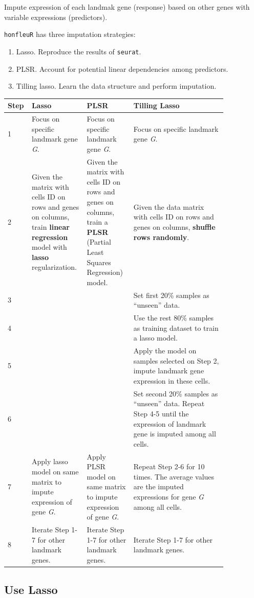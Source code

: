 \documentclass[]{article}
\providecommand{\tightlist}{%
  \setlength{\itemsep}{0pt}\setlength{\parskip}{0pt}}
\begin{document}
Impute expression of each landmak gene (response) based on other genes
with variable expressions (predictors).

\texttt{honfleuR} has three imputation strategies:

\begin{enumerate}
\def\labelenumi{\arabic{enumi}.}
\tightlist
\item
  Lasso. Reproduce the results of \texttt{seurat}.
\item
  PLSR. Account for potential linear dependencies among predictors.
\item
  Tilling lasso. Learn the data structure and perform imputation.
\end{enumerate}

\begin{longtable}[l]{p{0.05\linewidth} *{2}{p{0.2\linewidth}} p{0.4\linewidth} }
\toprule
Step & Lasso & PLSR & Tilling Lasso\tabularnewline
\midrule
\endhead
1 & Focus on specific landmark gene \emph{G}. & Focus on specific
landmark gene \emph{G}. & Focus on specific landmark gene
\emph{G}.\tabularnewline
2 & Given the matrix with cells ID on rows and genes on columns, train
\textbf{linear regression} model with \textbf{lasso} regularization. &
Given the matrix with cells ID on rows and genes on columns, train a
\textbf{PLSR} (Partial Least Squares Regression) model. & Given the data
matrix with cells ID on rows and genes on columns, \textbf{shuffle rows
randomly}.\tabularnewline
3 & & & Set first 20\% samples as ``unseen'' data.\tabularnewline
4 & & & Use the rest 80\% samples as training dataset to train a lasso
model.\tabularnewline
5 & & & Apply the model on samples selected on Step 2, impute landmark
gene expression in these cells.\tabularnewline
6 & & & Set second 20\% samples as ``unseen'' data. Repeat Step 4-5
until the expression of landmark gene is imputed among all
cells.\tabularnewline
7 & Apply lasso model on same matrix to impute expression of gene
\emph{G}. & Apply PLSR model on same matrix to impute expression of gene
\emph{G}. & Repeat Step 2-6 for 10 times. The average values are the
imputed expressions for gene \emph{G} among all cells.\tabularnewline
8 & Iterate Step 1-7 for other landmark genes. & Iterate Step 1-7 for
other landmark genes. & Iterate Step 1-7 for other landmark
genes.\tabularnewline
\bottomrule
\end{longtable}

\subsection{Use Lasso}\label{use-lasso}
\end{document}
